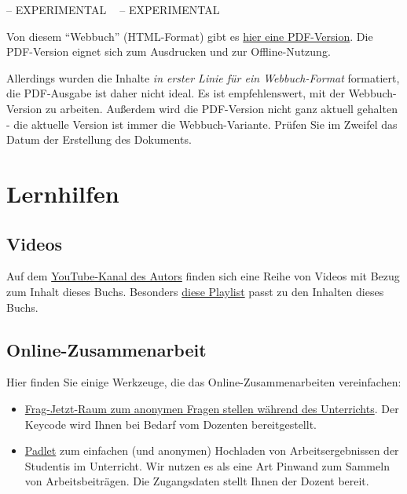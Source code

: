 \documentclass[
  a4paper,
  DIV=11]{scrreprt}
\providecommand{\tightlist}{%
  \setlength{\itemsep}{0pt}\setlength{\parskip}{0pt}}\usepackage{longtable,booktabs,array}
\theoremstyle{definition}
\theoremstyle{remark}
\begin{document}
-- EXPERIMENTAL 🔬🧪 -- EXPERIMENTAL

Von diesem ``Webbuch'' (HTML-Format) gibt es
\href{Start-Bayes!.pdf}{hier eine PDF-Version}. Die PDF-Version eignet
sich zum Ausdrucken und zur Offline-Nutzung.

Allerdings wurden die Inhalte \emph{in erster Linie für ein
Webbuch-Format} formatiert, die PDF-Ausgabe ist daher nicht ideal. Es
ist empfehlenswert, mit der Webbuch-Version zu arbeiten. Außerdem wird
die PDF-Version nicht ganz aktuell gehalten - die aktuelle Version ist
immer die Webbuch-Variante. Prüfen Sie im Zweifel das Datum der
Erstellung des Dokuments.

\hypertarget{lernhilfen}{%
\section*{Lernhilfen}\label{lernhilfen}}

\hypertarget{videos}{%
\subsection*{Videos}\label{videos}}

Auf dem
\href{https://www.youtube.com/channel/UCkvdtj8maE7g-SOCh4aDB9g}{YouTube-Kanal
des Autors} finden sich eine Reihe von Videos mit Bezug zum Inhalt
dieses Buchs. Besonders
\href{https://www.youtube.com/playlist?list=PLRR4REmBgpIGVptiSN-qDVEJKfFnUqDyL}{diese
Playlist} passt zu den Inhalten dieses Buchs.

\hypertarget{online-zusammenarbeit}{%
\subsection*{Online-Zusammenarbeit}\label{online-zusammenarbeit}}

Hier finden Sie einige Werkzeuge, die das Online-Zusammenarbeiten
vereinfachen:

\begin{itemize}
\tightlist
\item
  \href{https://frag.jetzt/home}{Frag-Jetzt-Raum zum anonymen Fragen
  stellen während des Unterrichts}. Der Keycode wird Ihnen bei Bedarf
  vom Dozenten bereitgestellt.
\item
  \href{https://de.padlet.com/}{Padlet} zum einfachen (und anonymen)
  Hochladen von Arbeitsergebnissen der Studentis im Unterricht. Wir
  nutzen es als eine Art Pinwand zum Sammeln von Arbeitsbeiträgen. Die
  Zugangsdaten stellt Ihnen der Dozent bereit.
\end{itemize}
\end{document}
